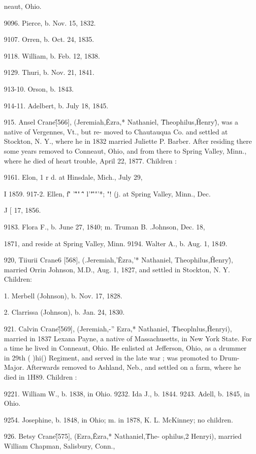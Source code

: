neaut, Ohio. 

9096. Pierce, b. Nov. 15, 1832. 

9107. Orren, b. Oct. 24, 1835. 

9118. William, b. Feb. 12, 1838. 

9129. Thuri, b. Nov. 21, 1841. 

913-10. Orson, b. 1843. 

914-11. Adelbert, b. July 18, 1845. 

915. Ansel Crane\^ [566], (Jeremiah,\^ Ezra,* Nathaniel, \^ 
Theophilus,\^ Henry\^), was a native of Vergennes, Vt., but re- 
moved to Chautauqua Co. and settled at Stockton, N. Y., where 
he in 1832 married Juliette P. Barber. After residing there some 
years removed to Conneaut, Ohio, and from there to Spring Valley, 
Minn., where he died of heart trouble, April 22, 1877. Children : 

9161. Elon, 1 r d. at Hinsdale, Mich., July 29, 

I 1859. 
917-2. Ellen, f\^' '\^"" \^\^' l'"\^'"'*; "! (j. at Spring Valley, Minn., Dec. 

J [ 17, 1856. 

9183. Flora F., b. June 27, 1840; m. Truman B. .Johnson, Dec. 18, 

1871, and reside at Spring Valley, Minn. 
9194. Walter A., b. Aug. 1, 1849. 

920, Tiiurii Crane6 [568], (.Jeremiah,'\^ Ezra,'* Nathaniel,  
Theophilus,\^ Henry\^), married Orrin Johnson, M.D., Aug. 1, 
1827, and settled in Stockton, N. Y. Children: 

1. Merbell (Johnson), b. Nov. 17, 1828. 

2. Clarrissa (Johnson), b. Jan. 24, 1830. 

921. Calvin Crane\^ [569], (Jeremiah,-'' Ezra,* Nathaniel, \^ 
Theoplnlus,\^ Henryi), married in 1837 Lexana Payne, a native 
of Massachusetts, in New York State. For a time he lived in 
Conneaut, Ohio. He enlisted at Jefferson, Ohio, as a drummer 
in 29th ( )hi() Regiment, and served in the late war ; was promoted 
to Drum-Major. Afterwards removed to Ashland, Neb., and 
settled on a farm, where he died in 1H89. Children : 

9221. William W., b. 1838, in Ohio. 
9232. Ida J., b. 1844. 
9243. Adell, b. 1845, in Ohio. 

9254. Josephine, b. 1848, in Ohio; m. in 1878, K. L. McKinney; no 
children. 

926. Betsy Crane\^ [575], (Ezra,\^ Ezra,* Nathaniel,\^ The- 
ophilus,2 Henryi), married William Chapman, Salisbury, Conn., 




